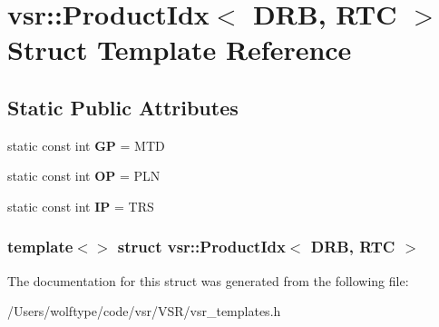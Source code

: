 \hypertarget{structvsr_1_1_product_idx_3_01_d_r_b_00_01_r_t_c_01_4}{\section{vsr\-:\-:Product\-Idx$<$ D\-R\-B, R\-T\-C $>$ Struct Template Reference}
\label{structvsr_1_1_product_idx_3_01_d_r_b_00_01_r_t_c_01_4}
}
\subsection*{Static Public Attributes}
\begin{DoxyCompactItemize}
\item 
\hypertarget{structvsr_1_1_product_idx_3_01_d_r_b_00_01_r_t_c_01_4_a17ec7dcab3aa4dee7acea80e59e33cc9}{static const int {\bfseries G\-P} = M\-T\-D}\label{structvsr_1_1_product_idx_3_01_d_r_b_00_01_r_t_c_01_4_a17ec7dcab3aa4dee7acea80e59e33cc9}

\item 
\hypertarget{structvsr_1_1_product_idx_3_01_d_r_b_00_01_r_t_c_01_4_a7f827dcb56101a704acce40afd4dc7c5}{static const int {\bfseries O\-P} = P\-L\-N}\label{structvsr_1_1_product_idx_3_01_d_r_b_00_01_r_t_c_01_4_a7f827dcb56101a704acce40afd4dc7c5}

\item 
\hypertarget{structvsr_1_1_product_idx_3_01_d_r_b_00_01_r_t_c_01_4_ac1db161dcbff04eedd3b01956b71f1bc}{static const int {\bfseries I\-P} = T\-R\-S}\label{structvsr_1_1_product_idx_3_01_d_r_b_00_01_r_t_c_01_4_ac1db161dcbff04eedd3b01956b71f1bc}

\end{DoxyCompactItemize}
\subsubsection*{template$<$$>$ struct vsr\-::\-Product\-Idx$<$ D\-R\-B, R\-T\-C $>$}



The documentation for this struct was generated from the following file\-:\begin{DoxyCompactItemize}
\item 
/\-Users/wolftype/code/vsr/\-V\-S\-R/vsr\-\_\-templates.\-h\end{DoxyCompactItemize}
